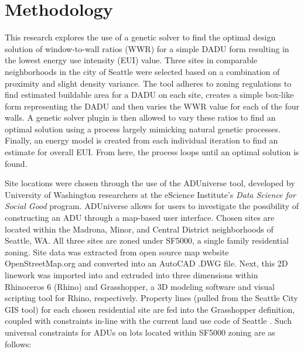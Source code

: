 \documentclass[sagev,times,Royal]{sagej}
\begin{document}
\section{Methodology} 
This research explores the use of a genetic solver to find the optimal design solution of window-to-wall ratios (WWR) for a simple DADU form resulting in the lowest energy use intensity (EUI) value. Three sites in comparable neighborhoods in the city of Seattle were selected based on a combination of proximity and slight density variance. The tool adheres to zoning regulations to find estimated buildable area for a DADU on each site, creates a simple box-like form representing the DADU and then varies the WWR value for each of the four walls. A genetic solver plugin is then allowed to vary these ratios to find an optimal solution using a process largely mimicking natural genetic processes. Finally, an energy model is created from each individual iteration to find an estimate for overall EUI. From here, the process loops until an optimal solution is found.

Site locations were chosen through the use of the ADUniverse tool, developed by University of Washington researchers at the eScience Institute's \textit{Data Science for Social Good} program\cite{ADUniverseToolEScience}. ADUniverse allows for users to investigate the possibility of constructing an ADU through a map-based user interface. Chosen sites are located within the Madrona, Minor, and Central District neighborhoods of Seattle, WA. All three sites are zoned under SF5000, a single family residential zoning. Site data was extracted from open source map website OpenStreetMap.org and converted into an AutoCAD .DWG file. Next, this 2D linework was imported into and extruded into three dimensions within Rhinoceros 6 (Rhino) and Grasshopper, a 3D modeling software and visual scripting tool for Rhino, respectively. Property lines (pulled from the Seattle City GIS tool) for each chosen residential site are fed into the Grasshopper definition, coupled with constraints in-line with the current land use code of Seattle \cite{SeattleLandUse2021}. Such universal constraints for ADUs on lots located within SF5000 zoning are as follows\cite{ADUniverseADURules}: 
\end{document}
